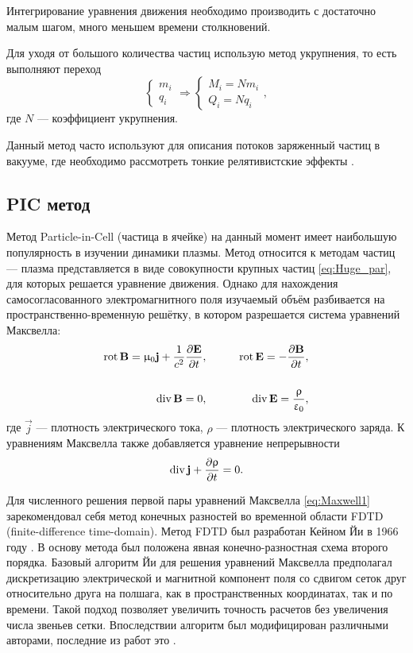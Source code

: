 Интегрирование уравнения движения необходимо производить с достаточно малым шагом, много меньшем времени столкновений.

Для уходя от большого количества частиц использую метод укрупнения, то есть выполняют переход
\begin{equation}
\begin{cases}
m_i \\
q_i
\end{cases} \Longrightarrow 
\begin{cases}
M_i = N m_i \\
Q_i = N q_i
\end{cases},
\label{eq:Huge_par}
\end{equation}
где $N$ --- коэффициент укрупнения.

Данный метод часто используют для описания потоков заряженный частиц в вакууме, где необходимо рассмотреть тонкие релятивистские эффекты \cite{Kravchenya2010,Kovtun2010,Kovtun2005}.

\subsection{PIC метод}

Метод Particle-in-Cell (частица в ячейке) на данный момент имеет наибольшую популярность в изучении динамики плазмы. Метод относится к методам частиц --- плазма представляется в виде совокупности крупных частиц \eqref{eq:Huge_par}, для которых решается уравнение движения. Однако для нахождения самосогласованного электромагнитного поля изучаемый объём разбивается на пространственно-временную решётку, в котором разрешается система уравнений Максвелла:
\begin{eqnarray}
\operatorname{rot} \mathbf{B} = \upmu_0 \mathbf{j} + \frac{1}{c^2} \dfrac{\partial \mathbf{E}}{\partial t}, &\qquad& \operatorname{rot} \mathbf{E} = - \dfrac{\partial \mathbf{B}}{\partial t}, \label{eq:Maxwell1} \\ \nonumber \\
\operatorname{div} \mathbf{B} = 0, &\qquad& \operatorname{div} \mathbf{E} = \dfrac{\uprho}{\upvarepsilon_0}, \label{eq:Maxwell2}
\end{eqnarray}
где $\vec{j}$ --- плотность электрического тока, $\rho$ --- плотность электрического заряда. К уравнениям Максвелла также добавляется уравнение непрерывности
\begin{equation}
\operatorname{div} \mathbf{j} + \frac{\partial {\uprho}}{\partial {t}} = 0.
\label{eq:conti}
\end{equation}

Для численного решения первой пары уравнений Максвелла \eqref{eq:Maxwell1} зарекомендовал себя метод конечных разностей во временной области FDTD (finite-difference time-domain). 
Метод FDTD был разработан Кейном Йи в 1966 году \cite{yee1966numerical}. В основу метода был положена явная конечно-разностная схема второго порядка. Базовый алгоритм Йи для решения уравнений Максвелла предполагал дискретизацию электрической и магнитной компонент поля со сдвигом сеток друг относительно друга на полшага, как в пространственных координатах, так и по времени. Такой подход позволяет увеличить точность расчетов без увеличения числа звеньев сетки. Впоследствии алгоритм был модифицирован различными авторами, последние из работ это \cite{melo2009computational,chaudhury2010computational,de2002solving,Rylander200075}.

